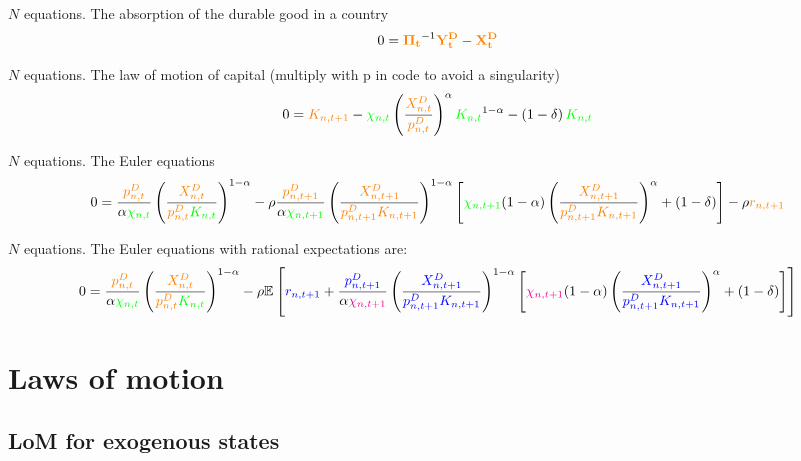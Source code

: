\documentclass[11pt]{article}
\newcommand{\cl}[1]{{\color{orange}{#1}}}
\newcommand{\st}[1]{{\color{green}{#1}}}
\newcommand{\stnext}[1]{{\color{magenta}{#1}}}
\newcommand{\clnext}[1]{{\color{blue}{#1}}}
\begin{document}
\noindent $N$ equations. The absorption of the durable good in a country 
\begin{equation}
0 = \mathbf{\cl{\Pi_t}}^{-1} \mathbf{\cl{Y^D_t}} - \mathbf{\cl{X^D_t}}
\end{equation}

\noindent $N$ equations. The law of motion of capital (multiply with p in code to avoid a singularity)
\begin{equation}
0 = \cl{K_{n,t+1}} - \st{\chi_{n,t}} \left( \frac{\cl{X_{n,t}^D}}{\cl{p_{n,t}^D}} \right)^{\alpha} \st{K_{n,t}}^{1-\alpha} - \left(1 - \delta\right) \st{K_{n,t}}
\end{equation}

\noindent $N$ equations. The Euler equations
\begin{equation}
0 = \frac{\cl{p_{n, t}^{D}}}{\alpha \st{\chi_{n, t}}}\left(\frac{\cl{X_{n, t}^{D}}}{\cl{p_{n, t}^{D}} \st{K_{n, t}}}\right)^{1-\alpha} - \rho \frac{\cl{p_{n, t+1}^{D}}}{\alpha \st{\chi_{n, t+1}}}\left(\frac{\cl{X_{n, t+1}^{D}}}{\cl{p_{n, t+1}^{D}} \cl{K_{n, t+1}}}\right)^{1-\alpha}\left[\st{\chi_{n, t+1}}(1-\alpha)\left(\frac{\cl{X_{n, t+1}^{D}}}{\cl{p_{n, t+1}^{D}} \cl{K_{n, t+1}}}\right)^{\alpha}+(1-\delta)\right]-\rho \cl{r_{n, t+1}}
\end{equation}

\noindent $N$ equations. The Euler equations with rational expectations are:
\begin{equation}
0 = \frac{\cl{p_{n, t}^{D}}}{\alpha \st{\chi_{n, t}}}\left(\frac{\cl{X_{n, t}^{D}}}{\cl{p_{n, t}^{D}} \st{K_{n, t}}}\right)^{1-\alpha} - \rho \mathbb{E}\left[\clnext{r_{n, t+1}} + \frac{\clnext{p_{n, t+1}^{D}}}{\alpha \stnext{\chi_{n, t+1}}}\left(\frac{\clnext{X_{n, t+1}^{D}}}{\clnext{p_{n, t+1}^{D}} \clnext{K_{n, t+1}}}\right)^{1-\alpha}\left[\stnext{\chi_{n, t+1}}(1-\alpha)\left(\frac{\clnext{X_{n, t+1}^{D}}}{\clnext{p_{n, t+1}^{D}} \clnext{K_{n, t+1}}}\right)^{\alpha}+(1-\delta)\right]\right]
\end{equation}


\section{Laws of motion}

\subsection{LoM for exogenous states}
\end{document}
